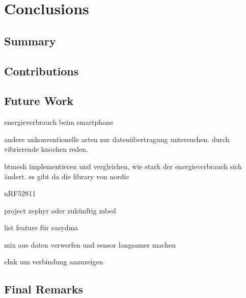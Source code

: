 \chapter{Conclusions}
\label{ch:closure}

\section{Summary}

\section{Contributions}

\section{Future Work}
energieverbrauch beim smartphone

andere unkonventionelle arten zur datenübertragung untersuchen. durch vibrierende knochen reden.

btmesh implementieren und vergleichen, wie stark der energieverbrauch sich ändert. es gibt da die library von nordic

nRF52811

project zephyr oder zukünftig mbed

list feature für easydma

mix aus daten verwerfen und sensor langsamer machen

eInk um verbindung anzuzeigen
\section{Final Remarks}
